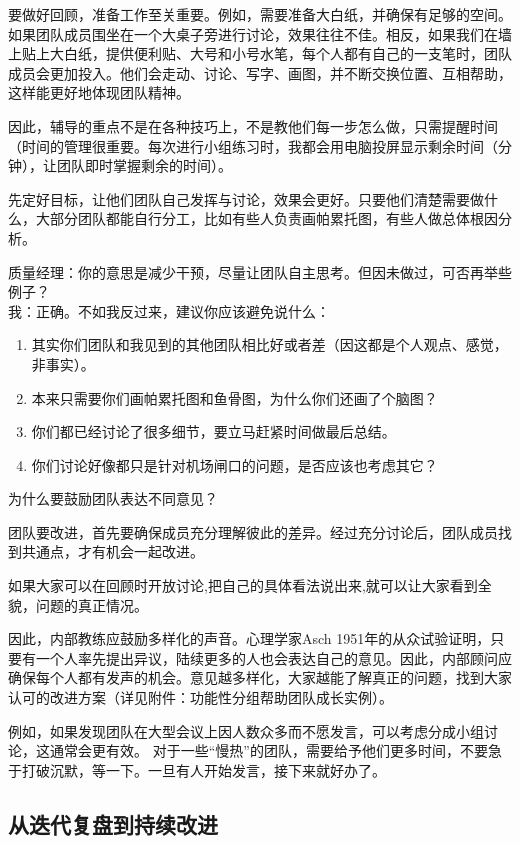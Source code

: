 \documentclass{book}        %
\providecommand{\tightlist}{%
  \setlength{\itemsep}{0pt}\setlength{\parskip}{0pt}}
\begin{document}
要做好回顾，准备工作至关重要。例如，需要准备大白纸，并确保有足够的空间。如果团队成员围坐在一个大桌子旁进行讨论，效果往往不佳。相反，如果我们在墙上贴上大白纸，提供便利贴、大号和小号水笔，每个人都有自己的一支笔时，团队成员会更加投入。他们会走动、讨论、写字、画图，并不断交换位置、互相帮助，这样能更好地体现团队精神。

因此，辅导的重点不是在各种技巧上，不是教他们每一步怎么做，只需提醒时间（时间的管理很重要。每次进行小组练习时，我都会用电脑投屏显示剩余时间（分钟），让团队即时掌握剩余的时间）。

先定好目标，让他们团队自己发挥与讨论，效果会更好。只要他们清楚需要做什么，大部分团队都能自行分工，比如有些人负责画帕累托图，有些人做总体根因分析。

质量经理：你的意思是减少干预，尽量让团队自主思考。但因未做过，可否再举些例子？\\
我：正确。不如我反过来，建议你应该避免说什么：

\begin{enumerate}
\tightlist
\item
  其实你们团队和我见到的其他团队相比好或者差（因这都是个人观点、感觉，非事实）。
\item
  本来只需要你们画帕累托图和鱼骨图，为什么你们还画了个脑图？
\item
  你们都已经讨论了很多细节，要立马赶紧时间做最后总结。
\item
  你们讨论好像都只是针对机场闸口的问题，是否应该也考虑其它？
\end{enumerate}

为什么要鼓励团队表达不同意见？

团队要改进，首先要确保成员充分理解彼此的差异。经过充分讨论后，团队成员找到共通点，才有机会一起改进。

如果大家可以在回顾时开放讨论,把自己的具体看法说出来,就可以让大家看到全貌，问题的真正情况。

因此，内部教练应鼓励多样化的声音。心理学家Asch
1951年的从众试验证明，只要有一个人率先提出异议，陆续更多的人也会表达自己的意见。因此，内部顾问应确保每个人都有发声的机会。意见越多样化，大家越能了解真正的问题，找到大家认可的改进方案（详见附件：功能性分组帮助团队成长实例）。

例如，如果发现团队在大型会议上因人数众多而不愿发言，可以考虑分成小组讨论，这通常会更有效。
对于一些``慢热''的团队，需要给予他们更多时间，不要急于打破沉默，等一下。一旦有人开始发言，接下来就好办了。

\hypertarget{ux4eceux8fedux4ee3ux590dux76d8ux5230ux6301ux7eedux6539ux8fdb}{%
\subsection{从迭代复盘到持续改进}\label{ux4eceux8fedux4ee3ux590dux76d8ux5230ux6301ux7eedux6539ux8fdb}}
\end{document}
